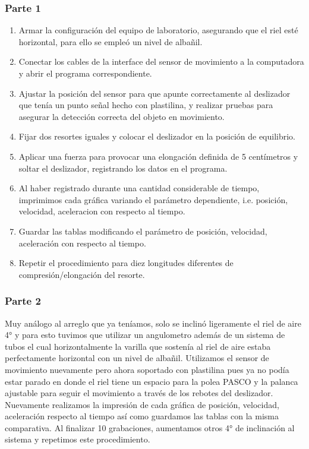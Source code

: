 \documentclass{article}
\begin{document}
\subsubsection*{Parte 1}
\begin{enumerate}
    \item Armar la configuración del equipo de laboratorio, asegurando que el riel esté horizontal, para ello se empleó un nivel de albañil.
    \item Conectar los cables de la interface del sensor de movimiento a la computadora y abrir el programa correspondiente.
    \item Ajustar la posición del sensor para que apunte correctamente al deslizador que tenía un punto señal hecho con plastilina, y realizar pruebas para asegurar la detección correcta del objeto en movimiento.
    \item Fijar dos resortes iguales y colocar el deslizador en la posición de equilibrio.
    \item Aplicar una fuerza para provocar una elongación definida de 5 centímetros y soltar el deslizador, registrando los datos en el programa.
    \item Al haber registrado durante una cantidad considerable de tiempo, imprimimos cada gráfica variando el parámetro dependiente, i.e. posición, velocidad, aceleracion con respecto al tiempo.
    \item Guardar las tablas modificando el parámetro de posición, velocidad, aceleración con respecto al tiempo.
    \item Repetir el procedimiento para diez longitudes diferentes de compresión/elongación del resorte.
\end{enumerate}

\subsubsection*{Parte 2}
Muy análogo al arreglo que ya teníamos, solo se inclinó ligeramente el riel de aire 4° y para esto tuvimos que utilizar un angulometro además de un sistema de tubos el cual
horizontalmente la varilla que sostenía al riel de aire estaba perfectamente horizontal con un nivel de albañil. Utilizamos el sensor de movimiento nuevamente pero ahora soportado con plastilina pues ya no podía estar parado en donde el riel tiene un espacio para la polea PASCO y la palanca ajustable para seguir el movimiento a través de los rebotes del deslizador. Nuevamente realizamos la impresión de cada gráfica de posición, velocidad, aceleración respecto al tiempo así como guardamos las tablas con la misma comparativa. Al finalizar 10 grabaciones, aumentamos otros 4° de inclinación al sistema y repetimos este procedimiento.
\end{document}
